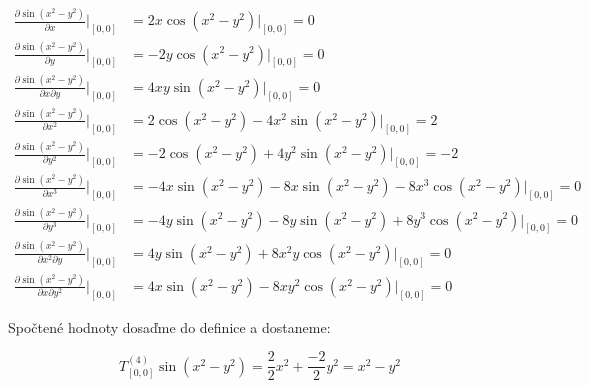 \documentclass[../main.tex]{subfiles}
\begin{document}
\begin{align*}
    \frac{\partial \sin(x^2 - y^2)}{\partial x }|_{[0,0]} &=   2x\cos(x^2 - y^2)  |_{[0,0]} = 0                           \\
    \frac{\partial \sin(x^2 - y^2)}{\partial y}|_{[0,0]} &=   -  2y\cos(x^2 - y^2)  |_{[0,0]} = 0                           \\
    \frac{\partial \sin(x^2 - y^2)}{\partial x \partial y}|_{[0,0]} &=   4xy\sin(x^2 - y^2)  |_{[0,0]}   = 0                         \\
    \frac{\partial \sin(x^2 - y^2)}{\partial x^2 }|_{[0,0]} &=   2\cos(x^2 - y^2) - 4x^2\sin(x^2 - y^2) |_{[0,0]} = 2                             \\
    \frac{\partial \sin(x^2 - y^2)}{\partial y^2}|_{[0,0]} &=   -2\cos(x^2 - y^2) + 4y^2\sin(x^2 - y^2) |_{[0,0]} = -2                               \\
    \frac{\partial \sin(x^2 - y^2)}{\partial x^3}|_{[0,0]} &=   - 4x\sin(x^2 - y^2) - 8x\sin(x^2 - y^2)  - 8x^3\cos(x^2 - y^2) |_{[0,0]}     = 0                       \\
    \frac{\partial \sin(x^2 - y^2)}{\partial y^3}|_{[0,0]} &=   - 4y\sin(x^2 - y^2) - 8y\sin(x^2 - y^2)  + 8y^3\cos(x^2 - y^2) |_{[0,0]}     = 0                                                      \\
    \frac{\partial \sin(x^2 - y^2)}{\partial x^2 \partial y}|_{[0,0]} &=     4y\sin(x^2 - y^2) + 8x^2y\cos(x^2 - y^2) |_{[0,0]}    = 0                        \\
    \frac{\partial \sin(x^2 - y^2)}{\partial x \partial y^2}|_{[0,0]} &=   4x\sin(x^2 - y^2) - 8xy^2\cos(x^2 - y^2) |_{[0,0]}    = 0                       
\end{align*}


Spočtené hodnoty dosaďme do definice a dostaneme:

\begin{equation*}
    T^{(4)}_{[0,0]} \sin (x^2 - y^2) = \frac{2}{2} x^2  + \frac{-2}{2} y^2  = x^2 - y^2
\end{equation*}
\end{document}
